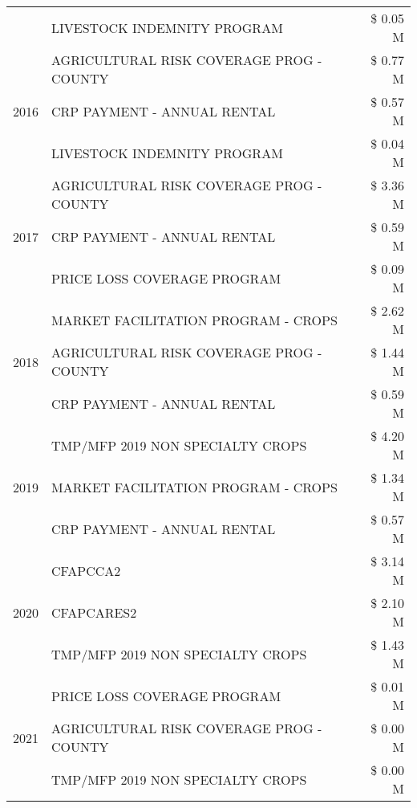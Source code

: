 \begin{tabular}{llr}
 & LIVESTOCK INDEMNITY PROGRAM & \$ 0.05 M \\
\cline{1-3}
\multirow[t]{3}{*}{2016} & AGRICULTURAL RISK COVERAGE PROG - COUNTY & \$ 0.77 M \\
 & CRP PAYMENT - ANNUAL RENTAL & \$ 0.57 M \\
 & LIVESTOCK INDEMNITY PROGRAM & \$ 0.04 M \\
\cline{1-3}
\multirow[t]{3}{*}{2017} & AGRICULTURAL RISK COVERAGE PROG - COUNTY & \$ 3.36 M \\
 & CRP PAYMENT - ANNUAL RENTAL & \$ 0.59 M \\
 & PRICE LOSS COVERAGE PROGRAM & \$ 0.09 M \\
\cline{1-3}
\multirow[t]{3}{*}{2018} & MARKET FACILITATION PROGRAM - CROPS & \$ 2.62 M \\
 & AGRICULTURAL RISK COVERAGE PROG - COUNTY & \$ 1.44 M \\
 & CRP PAYMENT - ANNUAL RENTAL & \$ 0.59 M \\
\cline{1-3}
\multirow[t]{3}{*}{2019} & TMP/MFP 2019 NON SPECIALTY CROPS & \$ 4.20 M \\
 & MARKET FACILITATION PROGRAM - CROPS & \$ 1.34 M \\
 & CRP PAYMENT - ANNUAL RENTAL & \$ 0.57 M \\
\cline{1-3}
\multirow[t]{3}{*}{2020} & CFAPCCA2 & \$ 3.14 M \\
 & CFAPCARES2 & \$ 2.10 M \\
 & TMP/MFP 2019 NON SPECIALTY CROPS & \$ 1.43 M \\
\cline{1-3}
\multirow[t]{3}{*}{2021} & PRICE LOSS COVERAGE PROGRAM & \$ 0.01 M \\
 & AGRICULTURAL RISK COVERAGE PROG - COUNTY & \$ 0.00 M \\
 & TMP/MFP 2019 NON SPECIALTY CROPS & \$ 0.00 M \\
\cline{1-3}
\bottomrule
\end{tabular}
